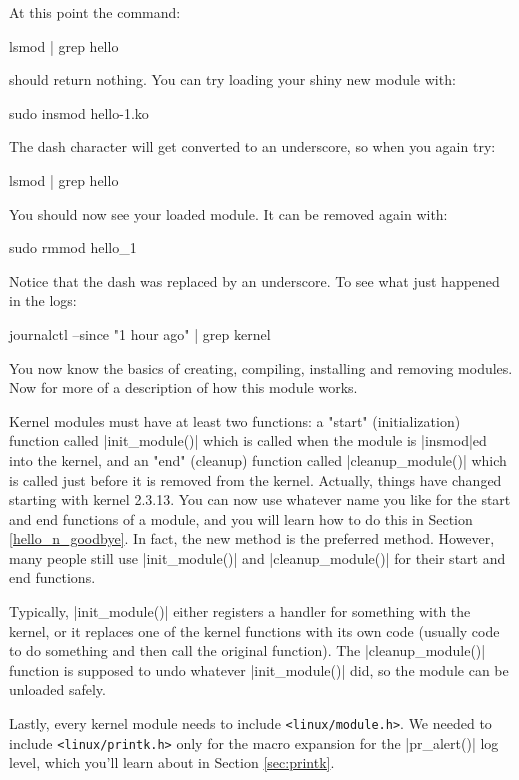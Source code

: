 \documentclass[10pt, oneside]{book}
\begin{document}
At this point the command:
\begin{codebash}
lsmod | grep hello
\end{codebash}

should return nothing.
You can try loading your shiny new module with:
\begin{codebash}
sudo insmod hello-1.ko
\end{codebash}

The dash character will get converted to an underscore, so when you again try:
\begin{codebash}
lsmod | grep hello
\end{codebash}

You should now see your loaded module. It can be removed again with:
\begin{codebash}
sudo rmmod hello_1
\end{codebash}

Notice that the dash was replaced by an underscore.
To see what just happened in the logs:
\begin{codebash}
journalctl --since "1 hour ago" | grep kernel
\end{codebash}

You now know the basics of creating, compiling, installing and removing modules.
Now for more of a description of how this module works.

Kernel modules must have at least two functions: a "start" (initialization) function called \cpp|init_module()| which is called when the module is \sh|insmod|ed into the kernel, and an "end" (cleanup) function called \cpp|cleanup_module()| which is called just before it is removed from the kernel.
Actually, things have changed starting with kernel 2.3.13.
You can now use whatever name you like for the start and end functions of a module, and you will learn how to do this in Section \ref{hello_n_goodbye}.
In fact, the new method is the preferred method.
However, many people still use \cpp|init_module()| and \cpp|cleanup_module()| for their start and end functions.

Typically, \cpp|init_module()| either registers a handler for something with the kernel, or it replaces one of the kernel functions with its own code (usually code to do something and then call the original function).
The \cpp|cleanup_module()| function is supposed to undo whatever \cpp|init_module()| did, so the module can be unloaded safely.

Lastly, every kernel module needs to include \verb|<linux/module.h>|.
We needed to include \verb|<linux/printk.h>| only for the macro expansion for the \cpp|pr_alert()| log level, which you'll learn about in Section \ref{sec:printk}.
\end{document}
